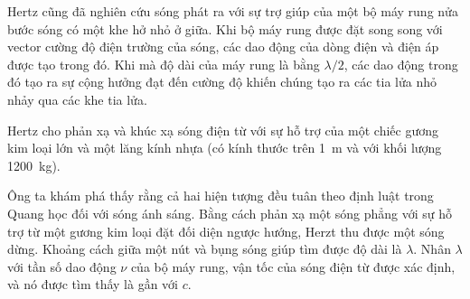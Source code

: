 
Hertz cũng đã nghiên cứu sóng phát ra với sự trợ giúp của một bộ máy rung nửa bước sóng có một khe hở nhỏ ở giữa.
Khi bộ máy rung được đặt song song với vector cường độ điện trường của sóng, các dao động của dòng điện và điện áp được tạo trong đó.
Khi mà độ dài của máy rung là bằng $\lambda/2$, các dao động trong đó tạo ra sự cộng hưởng đạt đến cường độ khiến chúng tạo ra các tia lửa nhỏ nhảy qua các khe tia lửa.


Hertz cho phản xạ và khúc xạ sóng điện từ với sự hỗ trợ của một chiếc gương kim loại lớn và một lăng kính nhựa (có kính thước trên \SI{1}{\metre} và với khối lượng \SI{1200}{\kilo\gram}).



Ông ta khám phá thấy rằng cả hai hiện tượng đều tuân theo định luật trong Quang học đối với sóng ánh sáng.
Bằng cách phản xạ một sóng phẳng với sự hỗ trợ từ một gương kim loại đặt đối diện ngược hướng, Herzt thu được một sóng dừng.
Khoảng cách giữa một nút và bụng sóng giúp tìm được độ dài là $\lambda$.
Nhân $\lambda$ với tần số dao động $\nu$ của bộ máy rung, vận tốc của sóng điện từ được xác định, và nó được tìm thấy là gần với $c$.


